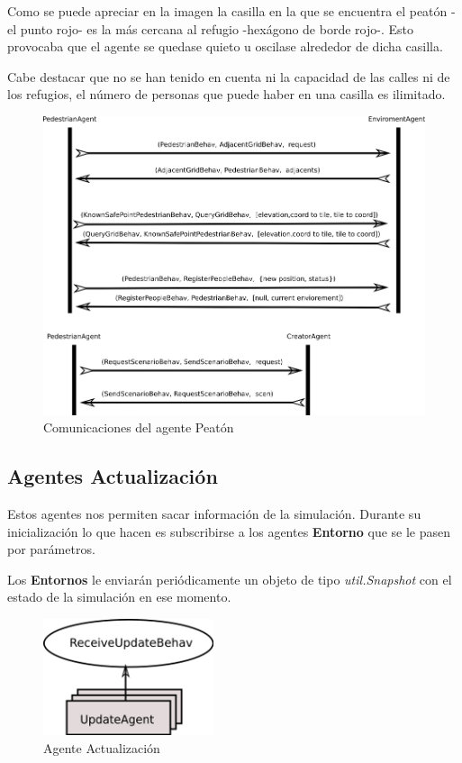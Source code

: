 Como se puede apreciar en la imagen la casilla en la que se encuentra el peatón
-el punto rojo- es la más cercana al refugio -hexágono de borde rojo-. Esto
provocaba que el agente se quedase quieto u oscilase alrededor de dicha casilla.

Cabe destacar que no se han tenido en cuenta ni la capacidad de las calles ni
de los refugios, el número de personas que puede haber en una casilla es
ilimitado.

\begin{figure}[H]
 \centering
 \includegraphics[width=135mm]{figuras/cap5/com_pedestrian.png}
 \caption{Comunicaciones del agente Peatón}
\end{figure}

\subsection*{Agentes Actualización}

Estos agentes nos permiten sacar información de la simulación. Durante su
inicialización lo que hacen es subscribirse a los agentes {\bf Entorno} que se
le pasen por parámetros.

Los {\bf Entornos} le enviarán periódicamente un objeto de tipo {\em
util.Snapshot} con el estado de la simulación en ese momento.

\begin{figure}[H]
 \centering
 \includegraphics[width=50mm]{figuras/cap5/ag_update.png}
 \caption{Agente Actualización}
\end{figure}

